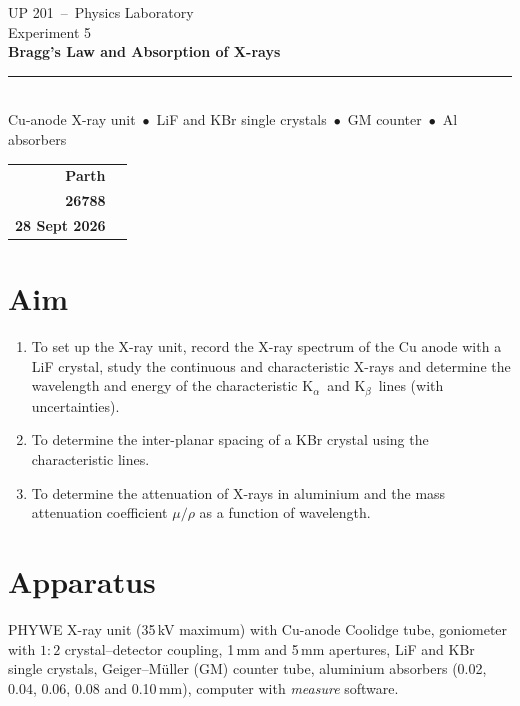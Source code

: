 \documentclass[11pt,a4paper]{article}
\newcommand{\Ka}{K$_\alpha$}
\newcommand{\Kb}{K$_\beta$}
\begin{document}
\begin{titlepage}
\centering
\vspace*{1.5cm}
{\large UP 201 \,--\, Physics Laboratory}\\[0.4cm]
{\Large Experiment 5}\\[1.2cm]
{\Huge\bfseries Bragg's Law and Absorption of X-rays}\\[0.6cm]
\rule{0.8\textwidth}{0.6pt}\\[0.6cm]
{\large Cu-anode X-ray unit \,$\bullet$\, LiF and KBr single crystals \,$\bullet$\, GM counter \,$\bullet$\, Al absorbers}\\[3cm]
\begin{tabular}{rl}
\textbf{Parth}\\[0.5cm]
\textbf{26788}\\[0.5cm]
\textbf{28 Sept 2026}\\[0.5cm]
\end{tabular}
\vfill
\end{titlepage}

\tableofcontents
\clearpage
\listoffigures
\listoftables
\clearpage
{}

\section{Aim}
\begin{enumerate}[label=\arabic*.]
\item To set up the X-ray unit, record the X-ray spectrum of the Cu anode with a LiF crystal, study the continuous and characteristic X-rays and determine the wavelength and energy of the characteristic \Ka\ and \Kb\ lines (with uncertainties).
\item To determine the inter-planar spacing of a KBr crystal using the characteristic lines.
\item To determine the attenuation of X-rays in aluminium and the mass attenuation coefficient $\mu/\rho$ as a function of wavelength.
\end{enumerate}

\section{Apparatus}
PHYWE X-ray unit (35\,kV maximum) with Cu-anode Coolidge tube, goniometer with $1{:}2$ crystal--detector coupling, 1\,mm and 5\,mm apertures, LiF and KBr single crystals, Geiger--M\"uller (GM) counter tube, aluminium absorbers (0.02, 0.04, 0.06, 0.08 and 0.10\,mm), computer with \emph{measure} software.
\end{document}

